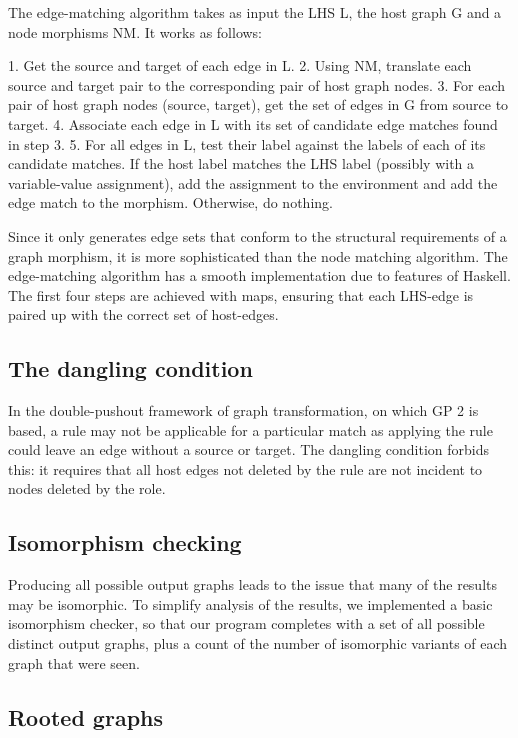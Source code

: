 The edge-matching algorithm takes as input the LHS L, the host graph G and a node morphisms NM. It works as follows:


1. Get the source and target of each edge in L.
2. Using NM, translate each source and target pair to the corresponding pair of host graph nodes.
3. For each pair of host graph nodes (source, target), get the set of edges in G from source to target.
4. Associate each edge in L with its set of candidate edge matches found in step 3.
5. For all edges in L, test their label against the labels of each of its candidate matches. If the host label matches the LHS label (possibly with a variable-value assignment), add the assignment to the environment and add the edge match to the morphism. Otherwise, do nothing.


Since it only generates edge sets that conform to the structural requirements of a graph morphism, it is more sophisticated than the node matching algorithm. The edge-matching algorithm has a smooth implementation due to features of Haskell. The first four steps are achieved with maps, ensuring that each LHS-edge is paired up with the correct set of host-edges.


\subsection{The dangling condition}

In the double-pushout framework of graph transformation, on which GP 2 is based, a rule may not be applicable for a particular match as applying the rule could leave an edge without a source or target. The dangling condition forbids this: it requires that all host edges not deleted by the rule are not incident to nodes deleted by the role.


\subsection{Isomorphism checking}

Producing all possible output graphs leads to the issue that many of the results may be isomorphic. To simplify analysis of the results, we implemented a basic isomorphism checker, so that our program completes with a set of all possible distinct output graphs, plus a count of the number of isomorphic variants of each graph that were seen.


\subsection{Rooted graphs}

